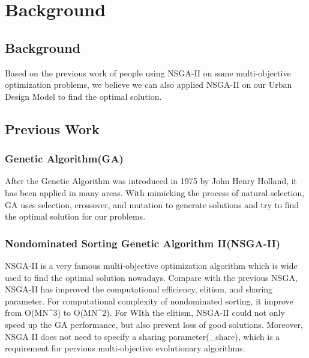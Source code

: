 \chapter{Background}
\label{chap:background}

\section{Background}
Based on the previous work of people using NSGA-II on some multi-objective optimization problems\cite{Magnier_2010_Multiobjective}, we believe we can also applied NSGA-II on our Urban Design Model to find the optimal solution. 

\section{Previous Work}

\subsection{Genetic Algorithm(GA)}
After the Genetic Algorithm was introduced in 1975 by John Henry Holland\cite{Holland_1975_Book}, it has been applied in many areas. With mimicking the process of natural selection, GA uses selection, crossover, and mutation to generate solutions and try to find the optimal solution for our problems. 

\subsection{Nondominated Sorting Genetic Algorithm II(NSGA-II)}
NSGA-II\cite{NSGA-II} is a very famous multi-objective optimization algorithm which is wide used  to find the optimal solution nowadays. Compare with the previous NSGA, NSGA-II has improved the computational efficiency, elitism, and sharing parameter. For computational complexity of nondominated sorting, it improve from O(MN^{3}) to O(MN^{2}). For WIth the elitism, NSGA-II could not only speed up the GA performance, but also prevent loss of good solutions. Moreover, NSGA II does not need to specify a sharing parameter(\sigma_{share}), which is a requirement for pervious multi-objective evolutionary algorithms.
